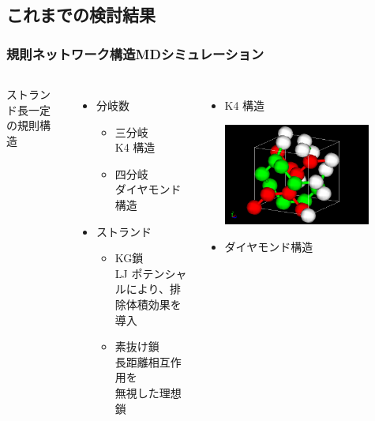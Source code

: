 \documentclass[12pt, dvipdfmx]{beamer}
\begin{document}
\subsection{これまでの検討結果}
\begin{frame}
	\frametitle{規則ネットワーク構造MDシミュレーション}
	\begin{columns}[totalwidth=1\textwidth]
			ストランド長一定の規則構造
			\begin{itemize}
				\item 分岐数 
					\begin{itemize}
						\item 三分岐\\K4 構造
						\item 四分岐\\ダイヤモンド構造
					\end{itemize}
				\item ストランド
					\begin{itemize}
						\item KG鎖\\LJ ポテンシャルにより、\alert{排除体積効果}を導入
						\item 素抜け鎖\\長距離相互作用を\\無視した\alert{理想鎖}
					\end{itemize}
			\end{itemize}
			\begin{itemize}
				\item K4 構造

				\includegraphics[width=0.8\textwidth]{K4_d.png}

				\item ダイヤモンド構造


\end{itemize}
\end{columns}
\end{frame}
\end{document}
